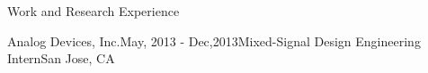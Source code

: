 \begin{rSection} {Work and Research Experience}
  \begin{rSubsection}{Analog Devices, Inc.}{May, 2013 - Dec,2013}{Mixed-Signal Design Engineering Intern}{San Jose, CA}
  \end{rSubsection}
\end{rSection}
